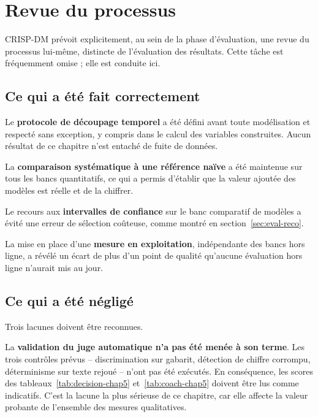 \section{Revue du processus}
\label{sec:revue-processus}

CRISP-DM prévoit explicitement, au sein de la phase d'évaluation, une revue du processus lui-même, distincte de l'évaluation des résultats. Cette tâche est fréquemment omise ; elle est conduite ici.

\subsection{Ce qui a été fait correctement}

Le \textbf{protocole de découpage temporel} a été défini avant toute modélisation et respecté sans exception, y compris dans le calcul des variables construites. Aucun résultat de ce chapitre n'est entaché de fuite de données.

La \textbf{comparaison systématique à une référence naïve} a été maintenue sur tous les bancs quantitatifs, ce qui a permis d'établir que la valeur ajoutée des modèles est réelle et de la chiffrer.

Le recours aux \textbf{intervalles de confiance} sur le banc comparatif de modèles a évité une erreur de sélection coûteuse, comme montré en section~\ref{sec:eval-reco}.

La mise en place d'une \textbf{mesure en exploitation}, indépendante des bancs hors ligne, a révélé un écart de plus d'un point de qualité qu'aucune évaluation hors ligne n'aurait mis au jour.

\subsection{Ce qui a été négligé}

Trois lacunes doivent être reconnues.

La \textbf{validation du juge automatique n'a pas été menée à son terme}. Les trois contrôles prévus -- discrimination sur gabarit, détection de chiffre corrompu, déterminisme sur texte rejoué -- n'ont pas été exécutés. En conséquence, les scores des tableaux~\ref{tab:decision-chap5} et~\ref{tab:coach-chap5} doivent être lus comme indicatifs. C'est la lacune la plus sérieuse de ce chapitre, car elle affecte la valeur probante de l'ensemble des mesures qualitatives.

